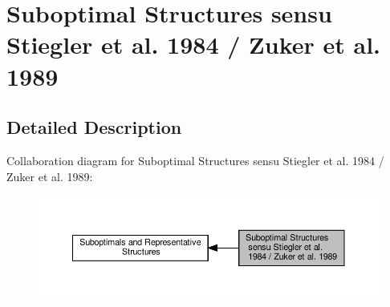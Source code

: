 \hypertarget{group__subopt__zuker}{}\section{Suboptimal Structures sensu Stiegler et al. 1984 / Zuker et al. 1989}
\label{group__subopt__zuker}


\subsection{Detailed Description}
Collaboration diagram for Suboptimal Structures sensu Stiegler et al. 1984 / Zuker et al. 1989\+:
\nopagebreak
\begin{figure}[H]
\begin{center}
\leavevmode
\includegraphics[width=350pt]{group__subopt__zuker}
\end{center}
\end{figure}
